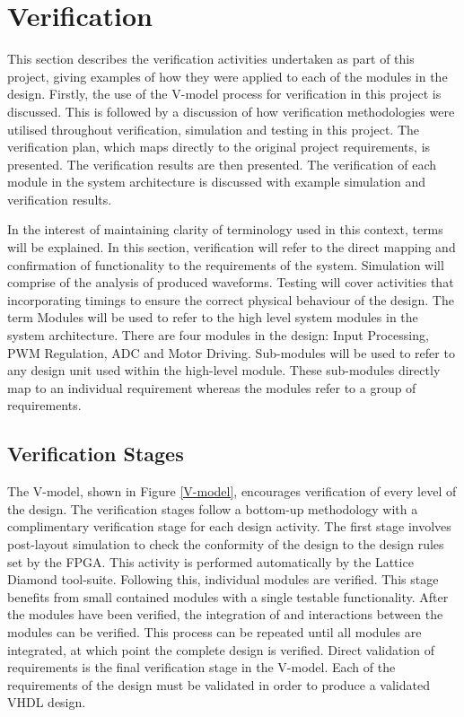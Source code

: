 \chapter{Verification}
\label{verification}

This section describes the verification activities undertaken as part of this project, giving examples of how they were applied to each of the modules in the design. Firstly, the use of the V-model process for verification in this project is discussed. This is followed by a discussion of how verification methodologies were utilised throughout verification, simulation and testing in this project. The verification plan, which maps directly to the original project requirements, is presented. The verification results are then presented. The verification of each module in the system architecture is discussed with example simulation and verification results. 

In the interest of maintaining clarity of terminology used in this context, terms will be explained. In this section, verification will refer to the direct mapping and confirmation of functionality to the requirements of the system. Simulation will comprise of the analysis of produced waveforms. Testing will cover activities that incorporating timings to ensure the correct physical behaviour of the design. The term Modules will be used to refer to the high level system modules in the system architecture. There are four modules in the design: Input Processing, PWM Regulation, ADC and Motor Driving. Sub-modules will be used to refer to any design unit used within the high-level module. These sub-modules directly map to an individual requirement whereas the modules refer to a group of requirements.

\section{Verification Stages}

The V-model, shown in Figure \ref{V-model}, encourages verification of every level of the design. The verification stages follow a bottom-up methodology with a complimentary verification stage for each design activity. The first stage involves post-layout simulation to check the conformity of the design to the design rules set by the FPGA. This activity is performed automatically by the Lattice Diamond tool-suite. Following this, individual modules are verified. This stage benefits from small contained modules with a single testable functionality. After the modules have been verified, the integration of and interactions between the modules can be verified. This process can be repeated until all modules are integrated, at which point the complete design is verified. Direct validation of requirements is the final verification stage in the V-model. Each of the requirements of the design must be validated in order to produce a validated VHDL design.

